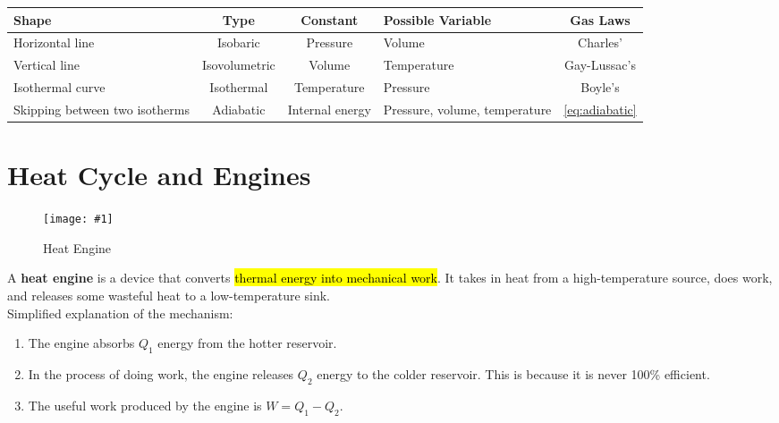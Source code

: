 \documentclass[a4paper,12pt]{article}
\let\oldsection\section
\renewcommand\section{\clearpage\oldsection}
\newcommand{\lb}{\\[8pt]}
\newcommand{\img}[4]{\begin{center}
  \begin{figure}[H]
    \centering
    \texttt{[image: \#1]}
    \caption{#3}
    \label{fig:#4}
  \end{figure}
\end{center}}
\begin{document}
\begin{table}[H]
  \centering
  \begin{tabular}{|P{0.2\textwidth}|c|c|P{0.23\textwidth}|c|}
    \hline
     \textbf{Shape} & \textbf{Type} & \textbf{Constant} & \textbf{Possible Variable}    & \textbf{Gas Laws}   \\ \hline
    Horizontal line                            & Isobaric      & Pressure          & Volume                        & Charles'            \\ \hline
    Vertical line                              & Isovolumetric & Volume            & Temperature                   & Gay-Lussac's        \\ \hline
    Isothermal curve                           & Isothermal    & Temperature       & Pressure                      & Boyle's             \\ \hline
    Skipping between two isotherms             & Adiabatic     & Internal energy   & Pressure, volume, temperature & \cref{eq:adiabatic} \\ \hline
  \end{tabular}
\end{table}

\section{Heat Cycle and Engines}


\begin{minipage}{0.35\textwidth}
  \img{engine.png}{1}{Heat Engine}{heatengine}
\end{minipage}\hspace*{0.02\textwidth}%
\begin{minipage}{0.6\textwidth}
  A \textbf{heat engine} is a device that converts \hl{thermal energy into mechanical work}. It takes in heat from a high-temperature source, does work, and releases some wasteful heat to a low-temperature sink.\lb
  Simplified explanation of the mechanism:
  \begin{enumerate}
    \item The engine absorbs $Q_1$ energy from the hotter reservoir.
    \item In the process of doing work, the engine releases $Q_2$ energy to the colder reservoir. This is because it is never 100\% efficient.
    \item The useful work produced by the engine is $W = Q_1 - Q_2$.
  \end{enumerate}
\end{minipage}\lb
\end{document}
